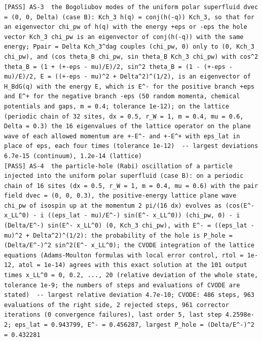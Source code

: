 \documentclass[
  10pt,
]{article}
\begin{document}
\begin{verbatim}
[PASS] AS-3  the Bogoliubov modes of the uniform polar superfluid dvec = (0, 0, Delta) (case B): Kch_3 h(q) = conj(h(-q)) Kch_3, so that for an eigenvector chi_pw of h(q) with the energy +eps or -eps the hole vector Kch_3 chi_pw is an eigenvector of conj(h(-q)) with the same energy; Ppair = Delta Kch_3^dag couples (chi_pw, 0) only to (0, Kch_3 chi_pw), and (cos theta_B chi_pw, sin theta_B Kch_3 chi_pw) with cos^2 theta_B = (1 + (+-eps - mu)/E)/2, sin^2 theta_B = (1 - (+-eps - mu)/E)/2, E = ((+-eps - mu)^2 + Delta^2)^(1/2), is an eigenvector of H_BdG(q) with the energy E, which is E^- for the positive branch +eps and E^+ for the negative branch -eps (50 random momenta, chemical potentials and gaps, m = 0.4; tolerance 1e-12); on the lattice (periodic chain of 32 sites, dx = 0.5, r_W = 1, m = 0.4, mu = 0.6, Delta = 0.3) the 16 eigenvalues of the lattice operator on the plane wave of each allowed momentum are +-E^- and +-E^+ with eps_lat in place of eps, each four times (tolerance 1e-12)  -- largest deviations 6.7e-15 (continuum), 1.2e-14 (lattice)
[PASS] AS-4  the particle-hole (Rabi) oscillation of a particle injected into the uniform polar superfluid (case B): on a periodic chain of 16 sites (dx = 0.5, r_W = 1, m = 0.4, mu = 0.6) with the pair field dvec = (0, 0, 0.3), the positive-energy lattice plane wave chi_pw of isospin up at the momentum 2 pi/(16 dx) evolves as (cos(E^- x_LL^0) - i ((eps_lat - mu)/E^-) sin(E^- x_LL^0)) (chi_pw, 0) - i (Delta/E^-) sin(E^- x_LL^0) (0, Kch_3 chi_pw), with E^- = ((eps_lat - mu)^2 + Delta^2)^(1/2): the probability of the hole is P_hole = (Delta/E^-)^2 sin^2(E^- x_LL^0); the CVODE integration of the lattice equations (Adams-Moulton formulas with local error control, rtol = 1e-12, atol = 1e-14) agrees with this exact solution at the 101 output times x_LL^0 = 0, 0.2, ..., 20 (relative deviation of the whole state, tolerance 1e-9; the numbers of steps and evaluations of CVODE are stated)  -- largest relative deviation 4.7e-10; CVODE: 486 steps, 963 evaluations of the right side, 2 rejected steps, 961 corrector iterations (0 convergence failures), last order 5, last step 4.2598e-2; eps_lat = 0.943799, E^- = 0.456287, largest P_hole = (Delta/E^-)^2 = 0.432281

\end{verbatim}
\end{document}
